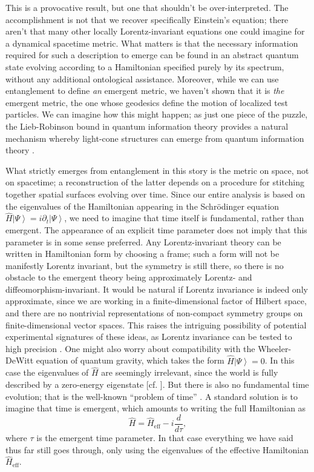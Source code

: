 \documentclass[12pt,english]{article}
\newcommand{\be}{\begin{equation}}
\newcommand{\ee}{\end{equation}}
\newcommand{\ham}{\hat{H}}
\newcommand{\ket}[1]{\left| #1 \right\rangle}
\begin{document}
This is a provocative result, but one that shouldn't be over-interpreted.
The accomplishment is not that we recover specifically Einstein's equation; there aren't that many other locally Lorentz-invariant equations one could imagine for a dynamical spacetime metric.
What matters is that the necessary information required for such a description to emerge can be found in an abstract quantum state evolving according to a Hamiltonian specified purely by its spectrum, without any additional ontological assistance.
Moreover, while we can use entanglement to define \emph{an} emergent metric, we haven't shown that it is \emph{the} emergent metric, the one whose geodesics define the motion of localized test particles.
We can imagine how this might happen; as just one piece of the puzzle, the Lieb-Robinson bound in quantum information theory \citep{Lieb:1972wy} provides a natural mechanism whereby light-cone structures can emerge from quantum information theory \citep{Hamma:2008jt}.

What strictly emerges from entanglement in this story is the metric on space, not on spacetime; a reconstruction of the latter depends on a procedure for stitching together spatial surfaces evolving over time.
Since our entire analysis is based on the eigenvalues of the Hamiltonian appearing in the Schr\"odinger equation $\ham\ket\Psi = i \partial_t\ket\Psi$, we need to imagine that time itself is fundamental, rather than emergent.
The appearance of an explicit time parameter does not imply that this parameter is in some sense preferred.
Any Lorentz-invariant theory can be written in Hamiltonian form by choosing a frame; such a form will not be manifestly Lorentz invariant, but the symmetry is still there, so there is no obstacle to the emergent theory being approximately Lorentz- and diffeomorphism-invariant.
It would be natural if Lorentz invariance is indeed only approximate, since we are working in a finite-dimensional factor of Hilbert space, and there are no nontrivial representations of non-compact symmetry groups on finite-dimensional vector spaces.
This raises the intriguing possibility of potential experimental signatures of these ideas, as Lorentz invariance can be tested to high precision \cite{Liberati:2013xla}.
One might also worry about compatibility with the Wheeler-DeWitt equation of quantum gravity, which takes the form $\ham\ket\Psi = 0$.
In this case the eigenvalues of $\ham$ are seemingly irrelevant, since the world is fully described by a zero-energy eigenstate [cf. \citep{Albrecht:2007mm}].
But there is also no fundamental time evolution; that is the well-known ``problem of time'' \citep{Anderson:2010xm}.
A standard solution is to imagine that time is emergent, which amounts to writing the full Hamiltonian as
\be
  \ham = \ham_\mathrm{eff} - i\frac{d}{d\tau},
\ee
where $\tau$ is the emergent time parameter.
In that case everything we have said thus far still goes through, only using the eigenvalues of the effective Hamiltonian $\ham_\mathrm{eff}$.
\end{document}
